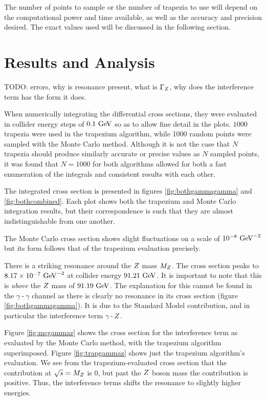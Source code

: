 \documentclass[]{article}
\providecommand{\e}[1]{\ensuremath{\times 10^{#1}}}
\begin{document}
The number of points to sample or the number of trapezia to use will depend on the computational power and time available, as well as the accuracy and precision desired. The exact values used will be discussed in the following section.


\section{Results and Analysis}\label{sec:results}

TODO: errors, why is resonance present, what is $\Gamma_{Z }$, why does the interference term has the form it does.

When numerically integrating the differential cross sections, they were evaluated in collider energy steps of $0.1\GeV$ so as to allow fine detail in the plots. $1000$ trapezia were used in the trapezium algorithm, while 1000 random points were sampled with the Monte Carlo method. Although it is not the case that $N$ trapezia should produce similarly accurate or precise values as $N$ sampled points, it was found that $N=1000$ for both algorithms allowed for both a fast enumeration of the integrals and consistent results with each other.

The integrated cross section is presented in figures \ref{fig:bothgammagamma} and \ref{fig:bothcombined}. Each plot shows both the trapezium and Monte Carlo integration results, but their correspondence is such that they are almost indistinguishable from one another.

The Monte Carlo cross section shows slight fluctuations on a scale of $10^{-8}\GeV^{-2}$ but its form follows that of the trapezium evaluation precisely.

There is a striking resonance around the $Z $ mass $M_{Z }$. The cross section peaks to $8.17\e{-7}\GeV^{-2}$ at collider energy $91.21\GeV$. It is important to note that this is \emph{above} the $Z $ mass of $91.19\GeV$. The explanation for this cannot be found in the $\gamma\operatorname{-}\gamma$ channel as there is clearly no resonance in its cross section (figure \ref{fig:bothgammagamma}). It is due to the Standard Model contribution, and in particular the interference term $\gamma\operatorname{-}Z $.

Figure \ref{fig:mcgammaz} shows the cross section for the interference term as evaluated by the Monte Carlo method, with the trapezium algorithm superimposed. Figure \ref{fig:trapgammaz} shows just the trapezium algorithm's evaluation. We see from the trapezium-evaluated cross section that the contribution at $\sqrt{s}=M_{Z }$ is $0$, but past the $Z $ boson mass the contribution is positive. Thus, the interference terms shifts the resonance to slightly higher energies.
\end{document}

